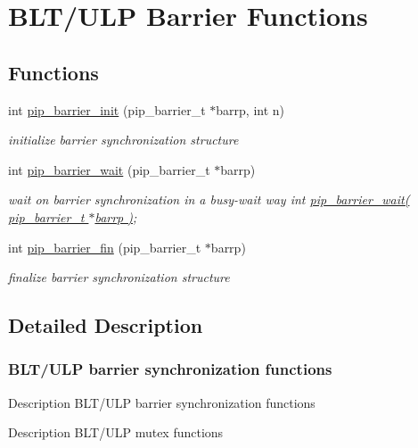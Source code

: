 \hypertarget{group__ulp-4-barrier}{\section{B\-L\-T/\-U\-L\-P Barrier Functions}
\label{group__ulp-4-barrier}
}
\subsection*{Functions}
\begin{DoxyCompactItemize}
\item 
int \hyperlink{group__ulp-4-barrier_ga84022f9c64f431e7d513342aeed0b61e}{pip\-\_\-barrier\-\_\-init} (pip\-\_\-barrier\-\_\-t $\ast$barrp, int n)
\begin{DoxyCompactList}\small\item\em initialize barrier synchronization structure \end{DoxyCompactList}\item 
int \hyperlink{group__ulp-4-barrier_gaca103c9732a8e28ee8faf79ef4a69e4f}{pip\-\_\-barrier\-\_\-wait} (pip\-\_\-barrier\-\_\-t $\ast$barrp)
\begin{DoxyCompactList}\small\item\em wait on barrier synchronization in a busy-\/wait way int \hyperlink{group__ulp-4-barrier_gaca103c9732a8e28ee8faf79ef4a69e4f}{pip\-\_\-barrier\-\_\-wait( pip\-\_\-barrier\-\_\-t $\ast$barrp )}; \end{DoxyCompactList}\item 
int \hyperlink{group__ulp-4-barrier_ga70dab15271b84fe05d7088a6cf8bf784}{pip\-\_\-barrier\-\_\-fin} (pip\-\_\-barrier\-\_\-t $\ast$barrp)
\begin{DoxyCompactList}\small\item\em finalize barrier synchronization structure \end{DoxyCompactList}\end{DoxyCompactItemize}


\subsection{Detailed Description}
\hypertarget{ulp-barrier}{}\subsubsection{B\-L\-T/\-U\-L\-P barrier synchronization functions}\label{ulp-barrier}
\begin{DoxyParagraph}{Description}
B\-L\-T/\-U\-L\-P barrier synchronization functions
\end{DoxyParagraph}
\begin{DoxyParagraph}{Description}
B\-L\-T/\-U\-L\-P mutex functions 
\end{DoxyParagraph}


